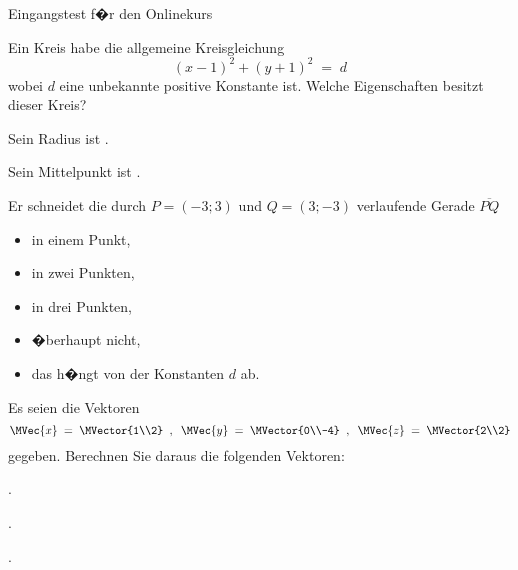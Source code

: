 \begin{MTest}{Eingangstest f�r den Onlinekurs}
\begin{MExercise}
Ein Kreis habe die allgemeine Kreisgleichung
$$
(x-1)^2+(y+1)^2 \;=\; d
$$
wobei $d$ eine unbekannte positive Konstante ist.
Welche Eigenschaften besitzt dieser Kreis?
\begin{MExerciseItems}
\item{Sein Radius ist .}
\item{Sein Mittelpunkt ist .}
\item{Er schneidet die durch $P=(-3;3)$ und $Q=(3;-3)$ verlaufende Gerade $\overline{P Q}$\\
\begin{itemize}
\item{ in einem Punkt,}
\item{ in zwei Punkten,}
\item{ in drei Punkten,}
\item{ �berhaupt nicht,}
\item{ das h�ngt von der Konstanten $d$ ab.}
\end{itemize}
}
\end{MExerciseItems}
\end{MExercise}


\begin{MExercise}
Es seien die Vektoren
$$
\MVec{x} \;=\; \MVector{1\\2}\;\; , \;\;
\MVec{y} \;=\; \MVector{0\\-4}\;\; , \;\;
\MVec{z} \;=\; \MVector{2\\2}
$$
gegeben. Berechnen Sie daraus die folgenden Vektoren:
\begin{MExerciseItems}
\item{.}
\item{.}
\item{.}
\end{MExerciseItems}
\end{MExercise}


\end{MTest}

\newpage
\MPrintIndex


